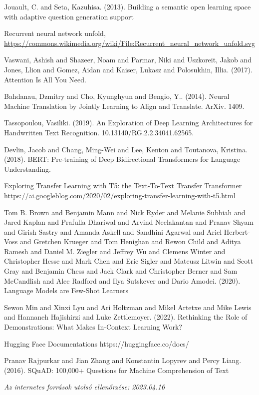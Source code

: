 \documentclass[12pt,a4paper]{report}
\begin{document}
\begin{thebibliography}{100}
 Jouault, C. and Seta, Kazuhisa. (2013). Building a semantic open learning space with adaptive question generation support

 Recurrent neural network unfold, \url{https://commons.wikimedia.org/wiki/File:Recurrent\_neural\_network\_unfold.svg}

 Vaswani, Ashish and Shazeer, Noam and Parmar, Niki and Uszkoreit, Jakob and Jones, Llion and Gomez, Aidan and Kaiser, Lukasz and Polosukhin, Illia. (2017). Attention Is All You Need.

 Bahdanau, Dzmitry and Cho, Kyunghyun and Bengio, Y.. (2014). Neural Machine Translation by Jointly Learning to Align and Translate. ArXiv. 1409.

 Tassopoulou, Vasiliki. (2019). An Exploration of Deep Learning Architectures for Handwritten Text Recognition. 10.13140/RG.2.2.34041.62565.

 Devlin, Jacob and Chang, Ming-Wei and Lee, Kenton and Toutanova, Kristina. (2018). BERT: Pre-training of Deep Bidirectional Transformers for Language Understanding.

 Exploring Transfer Learning with T5: the Text-To-Text Transfer Transformer https://ai.googleblog.com/2020/02/exploring-transfer-learning-with-t5.html

 Tom B. Brown and Benjamin Mann and Nick Ryder and Melanie Subbiah and Jared Kaplan and Prafulla Dhariwal and Arvind Neelakantan and Pranav Shyam and Girish Sastry and Amanda Askell and Sandhini Agarwal and Ariel Herbert-Voss and Gretchen Krueger and Tom Henighan and Rewon Child and Aditya Ramesh and Daniel M. Ziegler and Jeffrey Wu and Clemens Winter and Christopher Hesse and Mark Chen and Eric Sigler and Mateusz Litwin and Scott Gray and Benjamin Chess and Jack Clark and Christopher Berner and Sam McCandlish and Alec Radford and Ilya Sutskever and Dario Amodei. (2020). Language Models are Few-Shot Learners

 Sewon Min and Xinxi Lyu and Ari Holtzman and Mikel Artetxe and Mike Lewis and Hannaneh Hajishirzi and Luke Zettlemoyer. (2022). Rethinking the Role of Demonstrations: What Makes In-Context Learning Work?

 Hugging Face Documentations https://huggingface.co/docs/

 Pranav Rajpurkar and Jian Zhang and Konstantin Lopyrev and Percy Liang. (2016). SQuAD: 100,000+ Questions for Machine Comprehension of Text
\end{thebibliography}


\noindent \textit{Az internetes források utolsó ellenőrzése: 2023.04.16}

\pagestyle{empty}

\newpage


\end{document}
